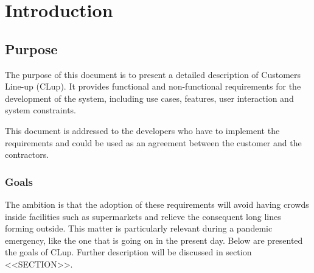 \chapter{Introduction}

\section{Purpose}
The purpose of this document is to present a detailed description of Customers Line-up (CLup).
It provides functional and non-functional requirements for the development of the system, including use cases, features, user interaction and system constraints.

This document is addressed to the developers who have to implement the requirements and could be used as an agreement between the customer and the contractors.

\subsection{Goals}
The ambition is that the adoption of these requirements will avoid having crowds inside facilities such as supermarkets and relieve the consequent long lines forming outside. This matter is particularly relevant during a pandemic emergency, like the one that is going on in the present day.\newline
Below are presented the goals of CLup. Further description will be discussed in section <<SECTION>>.

